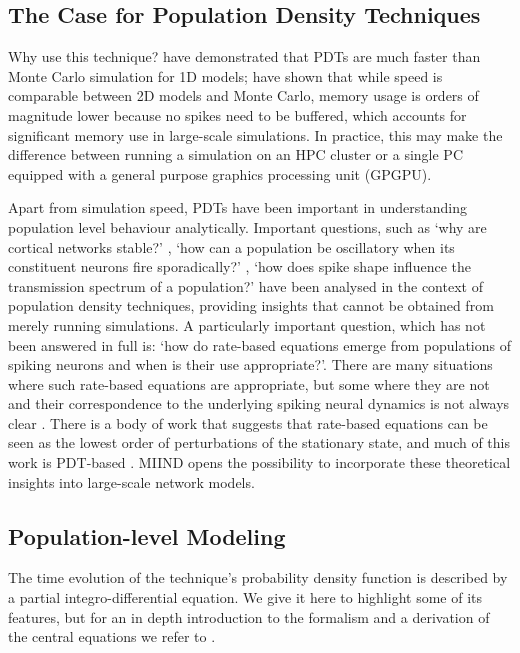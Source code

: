 \documentclass[utf8]{frontiersSCNS} %
\begin{document}
\subsection{The Case for Population Density Techniques} 
Why use this technique?
\cite{omurtag2000,nykamp2000population,kamps2003simple,iyer2013influence} have demonstrated that PDTs are much faster than Monte Carlo simulation for 1D models; \cite{de2019computational} have shown that while speed is comparable between 2D models and Monte Carlo, memory usage is orders of magnitude lower because no spikes need to be buffered, which accounts for significant memory use in large-scale simulations. In practice, this may make the difference between running a simulation on an HPC cluster or a single PC equipped with a general purpose graphics processing unit (GPGPU).

Apart from simulation speed, PDTs have been important in understanding population level behaviour analytically. Important questions, such as `why are cortical networks stable?' \citep{amit1997model}, `how can a population be oscillatory when its constituent neurons fire sporadically?'
\citep{brunel1999fast}, `how does spike shape influence the transmission spectrum of a population?'\citep{fourcaud2003spike} have been analysed in the context of population density techniques, providing insights that cannot be obtained from merely running simulations. A particularly important question, which has not been answered in full is: `how do rate-based equations emerge from populations of spiking neurons and when is their use appropriate?'. There are many situations where such rate-based equations are appropriate, but some where they are not and their correspondence to the underlying spiking neural dynamics is not always clear \citep{montbrio2015macroscopic,de2013generic}. There is a body of work that suggests that rate-based equations can be seen as the lowest order of perturbations of the stationary state, and much of this work is PDT-based \citep{mattia2002population,mattia2004finite,gerstner1998spiking,wilson1972excitatory,montbrio2015macroscopic}. MIIND opens the possibility to incorporate these theoretical insights into large-scale network models.\\

\subsection{Population-level Modeling}

The time evolution of the technique's probability density function is described by a partial integro-differential equation. We give it here to highlight some of its features, but for an in depth introduction to the formalism and a derivation of the central equations we refer to \cite{omurtag2000}.
\end{document}
